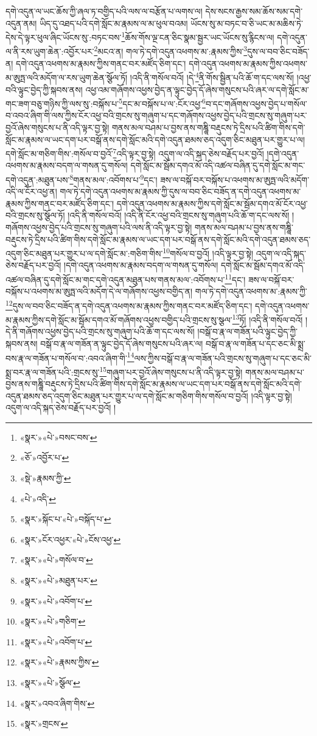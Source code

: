 དགེ་འདུན་ལ་ཡང་ཆོས་ཀྱི་ཞལ་ཏ་བགྱིད་པའི་ལས་ལ་བརྩོན་པ་ལགས་ལ། དེས་སངས་རྒྱས་སམ་ཆོས་སམ་དགེ་འདུན་ནམ། ཡིད་དུ་འཐད་པའི་དགེ་སློང་མ་རྣམས་ལ་མ་ཕུལ་བའམ། ཡོངས་སུ་མ་བཏང་བ་ཅི་ཡང་མ་མཆིས་ཏེ་དེས་དེ་ལྟར་ཕུལ་ཞིང་ཡོངས་སུ་:བཏང་བས་\footnote{«སྣར་»«པེ་»བསང་བས་}ཆོས་གོས་ལྔ་ངན་ཅིང་སྣམ་སྦྱར་ཡང་ཡོངས་སུ་རྙིངས་ལ། དགེ་འདུན་ལ་ནི་རས་ཡུག་ཆེན་:འབྱོར་པར་\footnote{«ཅོ་»འབྱོར་པ་}མངའ་ན། གལ་ཏེ་དགེ་འདུན་འཕགས་མ་:རྣམས་ཀྱིས་\footnote{«སྡེ་»རྣམས་ཀྱི་}དུས་ལ་བབ་ཅིང་བཟོད་ན། དགེ་འདུན་འཕགས་མ་རྣམས་ཀྱིས་གནང་བར་མཛོད་ཅིག་དང་། དགེ་འདུན་འཕགས་མ་རྣམས་ཀྱིས་འཕགས་མ་ཨུཏྤ་ལའི་མདོག་ལ་རས་ཡུག་ཆེན་སྩོལ་ཏོ། །འདི་ནི་གསོལ་བའོ། །དེ་\footnote{«པེ་»འདི་}ནི་གོས་སྦྱིན་པའི་ཆོ་ག་དང་ལས་སོ། །འཕྱ་བའི་ལྟུང་བྱེད་ཀྱི་སྐབས་ནས། འཕྱ་འམ་གཞོགས་འཕྱས་བྱེད་ན་ལྟུང་བྱེད་དོ་ཞེས་གསུངས་པའི་ཞར་ལ་དགེ་སློང་མ་གང་ཟག་བཅུ་གཉིས་ཀྱི་ལས་སུ་:བསྐོས་པ་\footnote{«སྣར་»སྐོང་པ་«པེ་»བསྐོད་པ་}དང་མ་བསྐོས་པ་ལ་:ངོར་འཕྱ་\footnote{«སྣར་»ངོར་འཕྱར་«པེ་»ངོས་འཕྱ་}བ་དང་གཞོགས་འཕྱས་བྱེད་པ་གསོལ་བ་འབའ་ཞིག་གི་ལས་ཀྱིས་ངོར་འཕྱ་བའི་གྲངས་སུ་གཞུག་པ་དང་གཞོགས་འཕྱས་བྱེད་པའི་གྲངས་སུ་གཞུག་པར་བྱའོ་ཞེས་གསུངས་པ་ནི་འདི་ལྟར་བྱ་སྟེ། གནས་མལ་བཤམ་པ་བྱས་ནས་གཎྜཱི་བརྡུངས་ཏེ་དྲིས་པའི་ཚིག་གིས་དགེ་སློང་མ་རྣམས་ལ་ཡང་དག་པར་བསྒོ་ནས་དགེ་སློང་མའི་དགེ་འདུན་ཐམས་ཅད་འདུག་ཅིང་མཐུན་པར་གྱུར་པ་ལ། དགེ་སློང་མ་གཅིག་གིས་:གསོལ་བ་བྱའོ་\footnote{«སྣར་»«པེ་»གསོལ་བ་}འདི་ལྟར་བྱ་སྟེ། འདུག་ལ་འདི་སྐད་ཅེས་བརྗོད་པར་བྱའོ། །དགེ་འདུན་འཕགས་མ་རྣམས་བདག་ལ་གསན་དུ་གསོལ། དགེ་སློང་མ་སྦོམ་དགའ་མོ་འདི་འཚལ་བཞིན་དུ་དགེ་སློང་མ་གང་དགེ་འདུན་:མཐུན་པས་\footnote{«སྣར་»«པེ་»མཐུན་པར་}གནས་མལ་:འབོགས་པ་\footnote{«སྣར་»«པེ་»འབོག་པ་}དང་། ཟས་ལ་བསྐོ་བར་བསྐོས་པ་འཕགས་མ་ཨུཏྤ་ལའི་མདོག་འདི་ལ་ངོར་འཕྱ་ན། གལ་ཏེ་དགེ་འདུན་འཕགས་མ་རྣམས་ཀྱི་དུས་ལ་བབ་ཅིང་བཟོད་ན་དགེ་འདུན་འཕགས་མ་རྣམས་ཀྱིས་གནང་བར་མཛོད་ཅིག་དང་། དགེ་འདུན་འཕགས་མ་རྣམས་ཀྱིས་དགེ་སློང་མ་སྦོམ་དགའ་མོ་ངོར་འཕྱ་བའི་གྲངས་སུ་སྩོལ་ཏོ། །འདི་ནི་གསོལ་བའོ། །འདི་ནི་ངོར་འཕྱ་བའི་གྲངས་སུ་གཞུག་པའི་ཆོ་ག་དང་ལས་སོ། །གཞོགས་འཕྱས་བྱེད་པའི་གྲངས་སུ་གཞུག་པའི་ལས་ནི་འདི་ལྟར་བྱ་སྟེ། གནས་མལ་བཤམ་པ་བྱས་ནས་གཎྜཱི་བརྡུངས་ཏེ་དྲིས་པའི་ཚིག་གིས་དགེ་སློང་མ་རྣམས་ལ་ཡང་དག་པར་བསྒོ་ནས་དགེ་སློང་མའི་དགེ་འདུན་ཐམས་ཅད་འདུག་ཅིང་མཐུན་པར་གྱུར་པ་ལ་དགེ་སློང་མ་:གཅིག་གིས་\footnote{«སྣར་»«པེ་»གཅིག་}གསོལ་བ་བྱའོ། །འདི་ལྟར་བྱ་སྟེ། འདུག་ལ་འདི་སྐད་ཅེས་བརྗོད་པར་བྱའོ། །དགེ་འདུན་འཕགས་མ་རྣམས་བདག་ལ་གསན་དུ་གསོལ། དགེ་སློང་མ་སྦོམ་དགའ་མོ་འདི་འཚལ་བཞིན་དུ་དགེ་སློང་མ་གང་དགེ་འདུན་མཐུན་པས་གནས་མལ་:འབོགས་པ་\footnote{«སྣར་»«པེ་»འབོག་པ་}དང་། ཟས་ལ་བསྐོ་བར་བསྐོས་པ་འཕགས་མ་ཨུཏྤ་ལའི་མདོག་དེ་ལ་གཞོགས་འཕྱས་བགྱིད་ན། གལ་ཏེ་དགེ་འདུན་འཕགས་མ་:རྣམས་ཀྱི་\footnote{«སྣར་»«པེ་»རྣམས་ཀྱིས་}དུས་ལ་བབ་ཅིང་བཟོད་ན་དགེ་འདུན་འཕགས་མ་རྣམས་ཀྱིས་གནང་བར་མཛོད་ཅིག་དང་། དགེ་འདུན་འཕགས་མ་རྣམས་ཀྱིས་དགེ་སློང་མ་སྦོམ་དགའ་མོ་གཞོགས་འཕྱས་བགྱིད་པའི་གྲངས་སུ་སྩལ་\footnote{«སྣར་»«པེ་»སྩོལ་}ཏོ། །འདི་ནི་གསོལ་བའོ། །དེ་ནི་གཞོགས་འཕྱས་བྱེད་པའི་གྲངས་སུ་གཞུག་པའི་ཆོ་ག་དང་ལས་སོ། །བསྒོ་བ་རྣ་ལ་གཟོན་པའི་ལྟུང་བྱེད་ཀྱི་སྐབས་ནས། བསྒོ་བ་རྣ་ལ་གཟོན་ན་ལྟུང་བྱེད་དོ་ཞེས་གསུངས་པའི་ཞར་ལ། བསྒོ་བ་རྣ་ལ་གཟོན་པ་དང་ཅང་མི་སྨྲ་བས་རྣ་ལ་གཟོན་པ་གསོལ་བ་:འབའ་ཞིག་གི་\footnote{«སྣར་»འབའ་ཞིག་གིས་}ལས་ཀྱིས་བསྒོ་བ་རྣ་ལ་གཟོན་པའི་གྲངས་སུ་གཞུག་པ་དང་ཅང་མི་སྨྲ་བར་རྣ་ལ་གཟོན་པའི་:གྲངས་སུ་\footnote{«སྣར་»གྲངས་}གཞུག་པར་བྱའོ་ཞེས་གསུངས་པ་ནི་འདི་ལྟར་བྱ་སྟེ། གནས་མལ་བཤམ་པ་བྱས་ནས་གཎྜཱི་བརྡུངས་ཏེ་དྲིས་པའི་ཚིག་གིས་དགེ་སློང་མ་རྣམས་ལ་ཡང་དག་པར་བསྒོ་ནས་དགེ་སློང་མའི་དགེ་འདུན་ཐམས་ཅད་འདུག་ཅིང་མཐུན་པར་གྱུར་པ་ལ་དགེ་སློང་མ་གཅིག་གིས་གསོལ་བ་བྱའོ། །འདི་ལྟར་བྱ་སྟེ། འདུག་ལ་འདི་སྐད་ཅེས་བརྗོད་པར་བྱའོ། །
